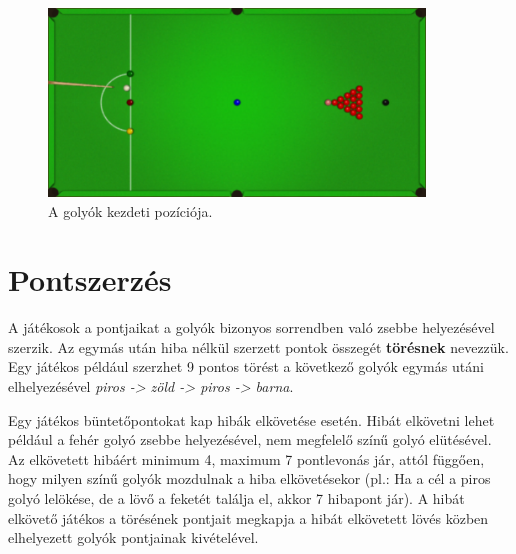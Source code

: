 \begin{figure}[!ht]
    \centering
    \includegraphics[width=100mm, keepaspectratio]{figures/starting_position.png}
    \caption{A golyók kezdeti pozíciója.}
    \label{fig:kezdeti_pozicio}
\end{figure}

\section{Pontszerzés}
A játékosok a pontjaikat a golyók bizonyos sorrendben való zsebbe helyezésével szerzik. Az egymás után hiba nélkül szerzett pontok összegét \textbf{törésnek} nevezzük. Egy játékos például szerzhet 9 pontos törést a következő golyók egymás utáni elhelyezésével \textit{piros -> zöld -> piros -> barna}.\cite{shamos2002new}
\par Egy játékos büntetőpontokat kap hibák elkövetése esetén. Hibát elkövetni lehet például a fehér golyó zsebbe helyezésével, nem megfelelő színű golyó elütésével. Az elkövetett hibáért minimum 4, maximum 7 pontlevonás jár, attól függően, hogy milyen színű golyók mozdulnak a hiba elkövetésekor (pl.: Ha a cél a piros golyó lelökése, de a lövő a feketét találja el, akkor 7 hibapont jár). A hibát elkövető játékos a törésének pontjait megkapja a hibát elkövetett lövés közben elhelyezett golyók pontjainak kivételével.\cite{snooker_rules}
